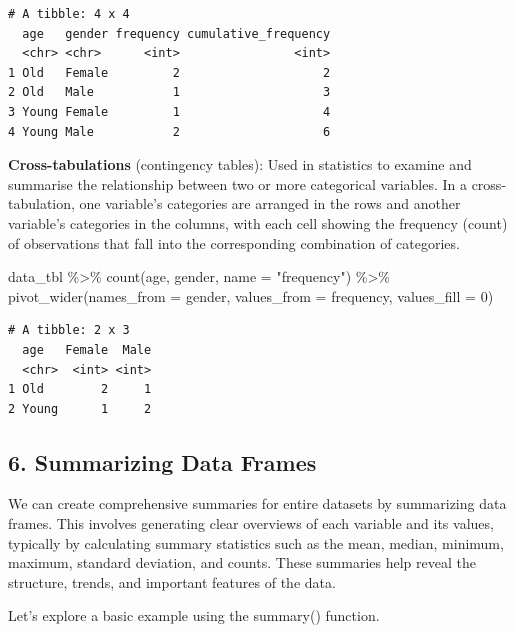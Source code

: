 \documentclass[
  man,
  floatsintext,
  longtable,
  nolmodern,
  notxfonts,
  notimes,
  colorlinks=true,linkcolor=blue,citecolor=blue,urlcolor=blue]{apa7}
\newenvironment{Shaded}{\begin{snugshade}}{\end{snugshade}}
\newcommand{\AttributeTok}[1]{\textcolor[rgb]{0.40,0.45,0.13}{#1}}
\newcommand{\DecValTok}[1]{\textcolor[rgb]{0.68,0.00,0.00}{#1}}
\newcommand{\FunctionTok}[1]{\textcolor[rgb]{0.28,0.35,0.67}{#1}}
\newcommand{\NormalTok}[1]{\textcolor[rgb]{0.00,0.23,0.31}{#1}}
\newcommand{\SpecialCharTok}[1]{\textcolor[rgb]{0.37,0.37,0.37}{#1}}
\newcommand{\StringTok}[1]{\textcolor[rgb]{0.13,0.47,0.30}{#1}}
\begin{document}
\begin{verbatim}
# A tibble: 4 x 4
  age   gender frequency cumulative_frequency
  <chr> <chr>      <int>                <int>
1 Old   Female         2                    2
2 Old   Male           1                    3
3 Young Female         1                    4
4 Young Male           2                    6
\end{verbatim}

\textbf{Cross-tabulations} (contingency tables): Used in statistics to
examine and summarise the relationship between two or more categorical
variables. In a cross-tabulation, one variable's categories are arranged
in the rows and another variable's categories in the columns, with each
cell showing the frequency (count) of observations that fall into the
corresponding combination of categories.

\begin{Shaded}
\begin{Highlighting}[]
\NormalTok{data\_tbl }\SpecialCharTok{\%\textgreater{}\%}
  \FunctionTok{count}\NormalTok{(age, gender, }\AttributeTok{name =} \StringTok{"frequency"}\NormalTok{) }\SpecialCharTok{\%\textgreater{}\%}
  \FunctionTok{pivot\_wider}\NormalTok{(}\AttributeTok{names\_from =}\NormalTok{ gender, }\AttributeTok{values\_from =}\NormalTok{ frequency, }\AttributeTok{values\_fill =} \DecValTok{0}\NormalTok{)}
\end{Highlighting}
\end{Shaded}

\begin{verbatim}
# A tibble: 2 x 3
  age   Female  Male
  <chr>  <int> <int>
1 Old        2     1
2 Young      1     2
\end{verbatim}

\subsection{6. Summarizing Data Frames}\label{summarizing-data-frames}

We can create comprehensive summaries for entire datasets by summarizing
data frames. This involves generating clear overviews of each variable
and its values, typically by calculating summary statistics such as the
mean, median, minimum, maximum, standard deviation, and counts. These
summaries help reveal the structure, trends, and important features of
the data.

Let's explore a basic example using the summary() function.
\end{document}
